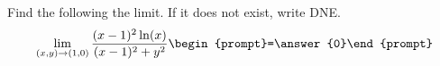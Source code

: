 \documentclass{ximera}
\author{David Guichard \and Neal Koblitz \and H. Jerome Keisler \and Albert Scheller \and Barry Balof \and Mike Wills \and Matthew Carr}
\begin{document}
\begin{exercise}




Find the following the limit. If it does not exist, write DNE. 
\[
\lim_{(x,y)\to (1,0)}\frac{(x-1)^2 \ln(x)}{(x-1)^2+y^2}\begin{prompt}=\answer{0}\end{prompt}
\]

\end{exercise}
\end{document}

